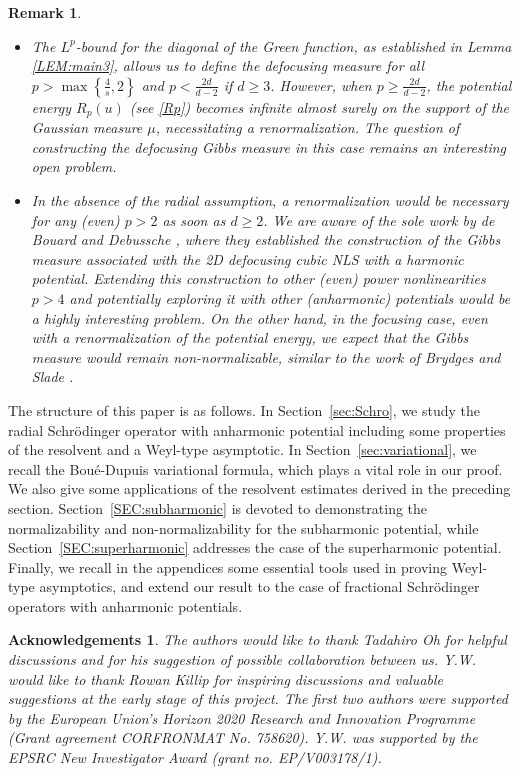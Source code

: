 \documentclass[%
11pt,  reqno]{amsart}
\theoremstyle{remarkstyle}
\newtheorem{remark}{Remark}[section]
\newcommand{\1}{\hspace{0.2mm}\text{I}\hspace{0.2mm}}
\newtheorem*{ackno}{Acknowledgements}
\numberwithin{equation}{section}
\numberwithin{theorem}{section}
\begin{document}
	\begin{remark}\mbox{}
		
		\begin{itemize}
			\item[(i)] The $L^p$-bound for the diagonal of the Green function, as established in Lemma \ref{LEM:main3}, allows us to define the defocusing measure for all $p>\max\left\{\frac{4}{s},2\right\}$ and $p<\frac{2d}{d-2}$ if $d\geq 3$. However, when $p\geq \frac{2d}{d-2}$, the potential energy $R_p(u)$ (see \eqref{Rp}) becomes infinite almost surely on the support of the Gaussian measure $\mu$, necessitating a renormalization. The question of constructing the defocusing Gibbs measure in this case remains an interesting open problem.
			
			\item[(ii)] In the absence of the radial assumption, a renormalization would be necessary for any (even) $p>2$ as soon as $d\geq 2$. We are aware of the sole work by de Bouard and Debussche \cite{deBDF22}, where they established the construction of the Gibbs measure associated with the 2D defocusing cubic NLS with a harmonic potential. Extending this construction to other (even) power nonlinearities $p>4$ and potentially exploring it with other (anharmonic) potentials would be a highly interesting problem. On the other hand, in the focusing case, even with a renormalization of the potential energy, we expect that the Gibbs measure would remain non-normalizable, similar to the work of Brydges and Slade \cite{BS96}.
		\end{itemize}
	\end{remark}
	
	The structure of this paper is as follows. In Section~\ref{sec:Schro}, we study the radial Schr\"odinger operator with anharmonic potential including some properties of the resolvent and a Weyl-type asymptotic. In Section~\ref{sec:variational}, we recall the Bou\'e-Dupuis variational formula, which plays a vital role in our proof. We also give some applications of the resolvent estimates derived in the preceding section. Section~\ref{SEC:subharmonic} is devoted to demonstrating the normalizability and non-normalizability for the subharmonic potential, while Section~\ref{SEC:superharmonic} addresses the case of the superharmonic potential. Finally, we recall in the appendices some essential tools used in proving Weyl-type asymptotics, and extend our result to the case of fractional Schr\"odinger operators with anharmonic potentials.
	
	\begin{ackno}
		The authors would like to thank Tadahiro Oh for helpful discussions and for his suggestion of possible collaboration between us. Y.W. would like to thank Rowan Killip for inspiring discussions and valuable suggestions at the early stage of this project.
		The first two authors were supported by the European Union's Horizon 2020 Research and Innovation Programme (Grant agreement CORFRONMAT No. 758620).
		Y.W. was supported by the EPSRC New Investigator Award (grant no. EP/V003178/1).
	\end{ackno}
	
\end{document}
